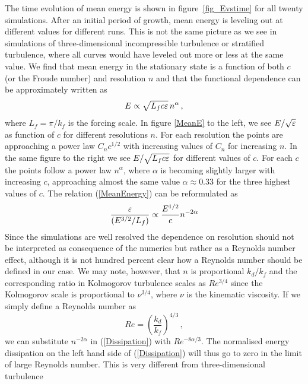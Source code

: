 The time evolution of  
mean energy is shown in
figure~\ref{fig_Evstime} for all twenty simulations. After an initial period of growth, mean energy is leveling out at different values for different runs.  This is not the same picture as we see in simulations of three-dimensional incompressible turbulence or stratified turbulence, where all curves would have leveled out more or less at the same value. We find that mean energy in the stationary state is a function of both $ c $ (or the Froude number) and resolution $ n $ and that the functional dependence  can be approximately written as
\begin{equation} \label{MeanEnergy}
E \propto \sqrt{L_f c \varepsilon} \, n^{\alpha}  \, ,
\end{equation} 
where $ L_f = \pi/k_f $ is the forcing scale. In figure \ref{MeanE} to the left, we see $ E/\sqrt{\varepsilon} $ as function of $ c $ for different resolutions $ n $. For each resolution the  points are approaching a power law $ C_n c^{1/2} $  with increasing values of $ C_n $ for increasing $ n $. In the same figure to the right we see 
$ E/\sqrt{L_f c \varepsilon} $ for different values of $ c $. For each $ c $ the points follow a power law $ n^{\alpha} $, where $ \alpha $ is becoming slightly larger with increasing $ c $, approaching almost the same value $ \alpha \approx 0.33 $ for the three highest values of $ c $.  The relation (\ref{MeanEnergy}) can be reformulated as
\begin{equation} \label{Dissipation}
\frac{\varepsilon} {(E^{3/2} / L_f)} \propto \frac{E^{1/2}}{c} n^{-2\alpha}
\end{equation} 
Since the simulations are well resolved the dependence on resolution should not be interpreted as consequence of the numerics but rather as a Reynolds number effect, although it is not hundred percent clear how a Reynolds number should be defined in our case.  We may note, however, that $ n $ is  proportional $ k_{d} / k_f $ and  the corresponding ratio in Kolmogorov turbulence scales as $ Re^{3/4} $ since the Kolmogorov scale is proportional to $ \nu^{3/4} $, where $ \nu $ is the kinematic viscosity. If we simply define a Reynolds number as
\begin{equation}
Re = \left ( \frac{k_d} {k_f} \right )^{4/3} \, ,
\end{equation} 
we can substitute $ n^{-2\alpha} $ in (\ref{Dissipation}) with $ Re^{-8 \alpha/3} $.  The normalised energy dissipation on the left hand side of  (\ref{Dissipation}) will thus go to zero in the limit of large Reynolds number. This is very different from three-dimensional turbulence 
